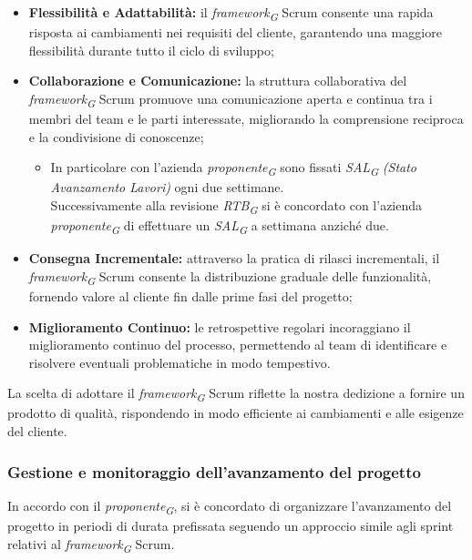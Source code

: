 \begin{itemize}
    \item \textbf{Flessibilità e Adattabilità:}
        il \textit{framework}\textsubscript{\textit{G}} Scrum consente una rapida risposta ai cambiamenti nei requisiti del cliente, garantendo una maggiore flessibilità durante tutto il ciclo di sviluppo;
    \item \textbf{Collaborazione e Comunicazione:}
        la struttura collaborativa del \textit{framework}\textsubscript{\textit{G}} Scrum promuove una comunicazione aperta e continua tra i membri del team e le parti interessate, migliorando la comprensione reciproca e la condivisione di conoscenze;
        \begin{itemize}
            \item In particolare con l'azienda \textit{proponente}\textsubscript{\textit{G}} sono fissati \textit{SAL}\textsubscript{\textit{G}} \textit{(Stato Avanzamento Lavori)} ogni due settimane. \\
            Successivamente alla revisione \textit{RTB}\textsubscript{\textit{G}} si è concordato con l'azienda \textit{proponente}\textsubscript{\textit{G}} di effettuare un \textit{SAL}\textsubscript{\textit{G}} a settimana anziché due.
        \end{itemize}
    \item \textbf{Consegna Incrementale:}
        attraverso la pratica di rilasci incrementali, il \textit{framework}\textsubscript{\textit{G}} Scrum consente la distribuzione graduale delle funzionalità, fornendo valore al cliente fin dalle prime fasi del progetto;
    \item \textbf{Miglioramento Continuo:}
        le retrospettive regolari incoraggiano il miglioramento continuo del processo, permettendo al team di identificare e risolvere eventuali problematiche in modo tempestivo.
\end{itemize}

La scelta di adottare il \textit{framework}\textsubscript{\textit{G}} Scrum riflette la nostra dedizione a fornire un prodotto di qualità, rispondendo in modo efficiente ai cambiamenti e alle esigenze del cliente.

\pagebreak

\subsubsection{Gestione e monitoraggio dell'avanzamento del progetto}
In accordo con il \textit{proponente}\textsubscript{\textit{G}}, si è concordato di organizzare l'avanzamento del progetto in periodi di durata prefissata seguendo un approccio simile agli sprint relativi al \textit{framework}\textsubscript{\textit{G}} Scrum.

